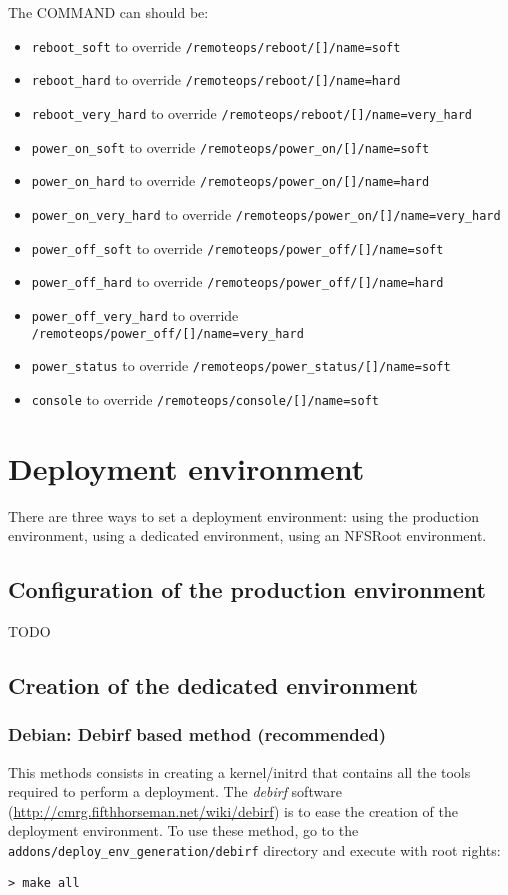 \documentclass[a4wide,10pt,oneside]{book}
\newcommand{\ypath}[1]{\texttt{#1}}
\begin{document}
The COMMAND can should be:
\begin{itemize}
  \item \texttt{reboot\_soft} to override \ypath{/remoteops/reboot/[]/name=soft}
  \item \texttt{reboot\_hard} to override \ypath{/remoteops/reboot/[]/name=hard}
  \item \texttt{reboot\_very\_hard} to override \ypath{/remoteops/reboot/[]/name=very\_hard}
  \item \texttt{power\_on\_soft} to override \ypath{/remoteops/power\_on/[]/name=soft}
  \item \texttt{power\_on\_hard} to override \ypath{/remoteops/power\_on/[]/name=hard}
  \item \texttt{power\_on\_very\_hard} to override \ypath{/remoteops/power\_on/[]/name=very\_hard}
  \item \texttt{power\_off\_soft} to override \ypath{/remoteops/power\_off/[]/name=soft}
  \item \texttt{power\_off\_hard} to override \ypath{/remoteops/power\_off/[]/name=hard}
  \item \texttt{power\_off\_very\_hard} to override \ypath{/remoteops/power\_off/[]/name=very\_hard}
  \item \texttt{power\_status} to override \ypath{/remoteops/power\_status/[]/name=soft}
  \item \texttt{console} to override \ypath{/remoteops/console/[]/name=soft}
\end{itemize}


\section{Deployment environment}
There are three ways to set a deployment environment: using the production environment, using a dedicated environment, using an NFSRoot environment.

\subsection{Configuration of the production environment}
TODO
\subsection{Creation of the dedicated environment}
\subsubsection{Debian: Debirf based method (recommended)}
This methods consists in creating a kernel/initrd that contains all the tools required to perform a deployment. The \emph{debirf} software (\url{http://cmrg.fifthhorseman.net/wiki/debirf}) is to ease the creation of the deployment environment. To use these method, go to the \texttt{addons/deploy\_env\_generation/debirf} directory and execute with root rights:
\begin{small}
\begin{verbatim}
> make all
\end{verbatim}
\end{small}
\end{document}
